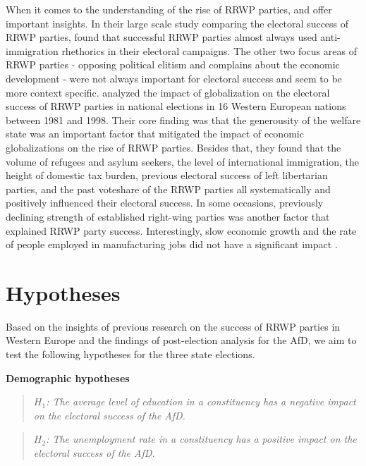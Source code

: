 \documentclass[12pt, hidelinks]{article}
\begin{document}
When it comes to the understanding of the rise of RRWP parties,  and  offer important insights.
In their large scale study comparing the electoral success of RRWP parties,  found that successful RRWP parties almost always used anti-immigration rhethorics in their electoral campaigns. The other two focus areas of RRWP parties - opposing political elitism and complains about the economic development - were not always important for electoral success and seem to be more context specific.
 analyzed the impact of globalization on the electoral success of RRWP parties in national elections in 16 Western European nations between 1981 and 1998. Their core finding was that the generousity of the welfare state was an important factor that mitigated the impact of economic globalizations on the rise of RRWP parties. Besides that, they found that the volume of refugees and asylum seekers, the level of international immigration, the height of  domestic tax burden, previous electoral success of left libertarian parties, and the past voteshare of the RRWP parties all systematically and positively influenced their electoral success. In some occasions, previously declining strength of established right-wing parties was another factor that explained RRWP party success. Interestingly, slow economic growth and the rate of people employed in manufacturing jobs did not have a significant impact \cite{swank2003globalization}.
\newpage
\section{Hypotheses}

Based on the insights of previous research on the success of RRWP parties in Western Europe and the findings of post-election analysis for the AfD, we aim to test the following hypotheses for the three state elections.

\textbf{Demographic hypotheses}
\begin{quote}
    \textit{$H_{1}$: The average level of education in a constituency has a negative impact on the electoral success of the AfD.}
\end{quote}

\begin{quote}
    \textit{$H_{2}$: The unemployment rate in a constituency has a positive impact on the electoral success of the AfD.}
\end{quote}
\end{document}
